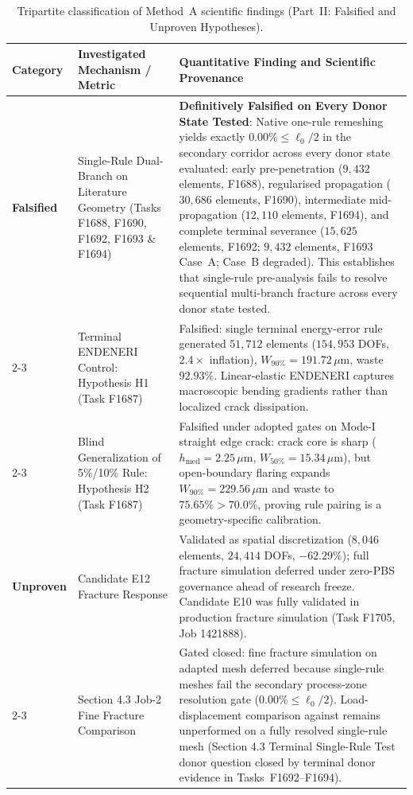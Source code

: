 \begin{table}[htbp]
\centering
\footnotesize
\caption{Tripartite classification of Method~A scientific findings (Part~II: Falsified and Unproven Hypotheses).}
\label{tab:method_a_tripartite_classification_part2}
\begin{tabularx}{\textwidth}{p{2.2cm}p{3.8cm}X}
\hline
\textbf{Category} & \textbf{Investigated Mechanism / Metric} & \textbf{Quantitative Finding and Scientific Provenance} \\
\hline
\textbf{Falsified} & Single-Rule Dual-Branch on Literature Geometry (Tasks F1688, F1690, F1692, F1693 \& F1694) & \textbf{Definitively Falsified on Every Donor State Tested}: Native one-rule remeshing yields exactly $0.00\% \le \ell_0/2$ in the secondary corridor across every donor state evaluated: early pre-penetration ($9{,}432$ elements, F1688), regularised propagation ($30{,}686$ elements, F1690), intermediate mid-propagation ($12{,}110$ elements, F1694), and complete terminal severance ($15{,}625$ elements, F1692; $9{,}432$ elements, F1693 Case~A; Case~B degraded). This establishes that single-rule pre-analysis fails to resolve sequential multi-branch fracture across every donor state tested. \\
\cline{2-3}
 & Terminal ENDENERI Control: Hypothesis H1 (Task F1687) & Falsified: single terminal energy-error rule generated $51{,}712$ elements ($154{,}953$ DOFs, $2.4\times$ inflation), $W_{90\%} = 191.72\,\mu\mathrm{m}$, waste $92.93\%$. Linear-elastic ENDENERI captures macroscopic bending gradients rather than localized crack dissipation. \\
\cline{2-3}
 & Blind Generalization of 5\%/10\% Rule: Hypothesis H2 (Task F1687) & Falsified under adopted gates on Mode-I straight edge crack: crack core is sharp ($h_{\mathrm{med}} = 2.25\,\mu\mathrm{m}$, $W_{50\%} = 15.34\,\mu\mathrm{m}$), but open-boundary flaring expands $W_{90\%} = 229.56\,\mu\mathrm{m}$ and waste to $75.65\% > 70.0\%$, proving rule pairing is a geometry-specific calibration. \\
\hline
\textbf{Unproven} & Candidate E12 Fracture Response & Validated as spatial discretization ($8{,}046$ elements, $24{,}414$ DOFs, $-62.29\%$); full fracture simulation deferred under zero-PBS governance ahead of research freeze. Candidate E10 was fully validated in production fracture simulation (Task F1705, Job 1421888). \\
\cline{2-3}
 & Section 4.3 Job-2 Fine Fracture Comparison & Gated closed: fine fracture simulation on adapted mesh deferred because single-rule meshes fail the secondary process-zone resolution gate ($0.00\% \le \ell_0/2$). Load-displacement comparison against \citet[Fig.~16a]{pandey2025} remains unperformed on a fully resolved single-rule mesh (Section 4.3 Terminal Single-Rule Test donor question closed by terminal donor evidence in Tasks~F1692--F1694). \\
\hline
\end{tabularx}
\end{table}

